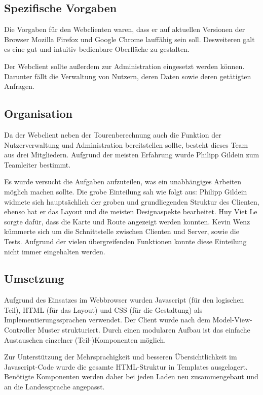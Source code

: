 \subsection*{Spezifische Vorgaben}

Die Vorgaben für den Webclienten waren, dass er auf aktuellen Versionen der Browser Mozilla Firefox und Google Chrome lauffähig sein soll.
Desweiteren galt es eine gut und intuitiv bedienbare Oberfläche zu gestalten.

Der Webclient sollte außerdem zur Administration eingesetzt werden können.
Darunter fällt die Verwaltung von Nutzern, deren Daten sowie deren getätigten Anfragen.

\subsection*{Organisation}

Da der Webclient neben der Tourenberechnung auch die Funktion der Nutzerverwaltung und Administration bereitstellen sollte, besteht dieses Team  aus drei Mitgliedern. 
Aufgrund der meisten Erfahrung wurde Philipp Gildein zum Teamleiter bestimmt.

Es wurde versucht die Aufgaben aufzuteilen, was ein unabhängiges Arbeiten möglich machen sollte.
Die grobe Einteilung sah wie folgt aus: Philipp Gildein widmete sich hauptsächlich der groben und grundliegenden Struktur des Clienten, ebenso hat er das Layout und die meisten Designaspekte bearbeitet.
Huy Viet Le sorgte dafür, dass die Karte und Route angezeigt werden konnten.
Kevin Wenz kümmerte sich um die Schnittstelle zwischen Clienten und Server, sowie die Tests.
Aufgrund der vielen übergreifenden Funktionen konnte diese Einteilung nicht immer eingehalten werden.

\subsection*{Umsetzung}

Aufgrund des Einsatzes im Webbrowser wurden Javascript (für den logischen Teil), HTML (für das Layout) und CSS (für die Gestaltung) als Implementierungssprachen verwendet.
Der Client wurde nach dem Model-View-Controller Muster strukturiert.
Durch einen modularen Aufbau ist das einfache Austauschen einzelner (Teil-)Komponenten möglich.

Zur Unterstützung der Mehrsprachigkeit und besseren Übersichtlichkeit im Javascript-Code wurde die gesamte HTML-Struktur in Templates ausgelagert.
Benötigte Komponenten werden daher bei jeden Laden neu zusammengebaut und an die Landessprache angepasst.

